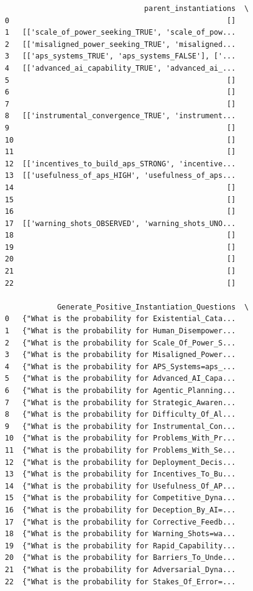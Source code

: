 \documentclass[
  11pt,
  letterpaper,
]{book}
\begin{document}
\begin{verbatim}
                                parent_instantiations  \
0                                                  []   
1   [['scale_of_power_seeking_TRUE', 'scale_of_pow...   
2   [['misaligned_power_seeking_TRUE', 'misaligned...   
3   [['aps_systems_TRUE', 'aps_systems_FALSE'], ['...   
4   [['advanced_ai_capability_TRUE', 'advanced_ai_...   
5                                                  []   
6                                                  []   
7                                                  []   
8   [['instrumental_convergence_TRUE', 'instrument...   
9                                                  []   
10                                                 []   
11                                                 []   
12  [['incentives_to_build_aps_STRONG', 'incentive...   
13  [['usefulness_of_aps_HIGH', 'usefulness_of_aps...   
14                                                 []   
15                                                 []   
16                                                 []   
17  [['warning_shots_OBSERVED', 'warning_shots_UNO...   
18                                                 []   
19                                                 []   
20                                                 []   
21                                                 []   
22                                                 []   

            Generate_Positive_Instantiation_Questions  \
0   {"What is the probability for Existential_Cata...   
1   {"What is the probability for Human_Disempower...   
2   {"What is the probability for Scale_Of_Power_S...   
3   {"What is the probability for Misaligned_Power...   
4   {"What is the probability for APS_Systems=aps_...   
5   {"What is the probability for Advanced_AI_Capa...   
6   {"What is the probability for Agentic_Planning...   
7   {"What is the probability for Strategic_Awaren...   
8   {"What is the probability for Difficulty_Of_Al...   
9   {"What is the probability for Instrumental_Con...   
10  {"What is the probability for Problems_With_Pr...   
11  {"What is the probability for Problems_With_Se...   
12  {"What is the probability for Deployment_Decis...   
13  {"What is the probability for Incentives_To_Bu...   
14  {"What is the probability for Usefulness_Of_AP...   
15  {"What is the probability for Competitive_Dyna...   
16  {"What is the probability for Deception_By_AI=...   
17  {"What is the probability for Corrective_Feedb...   
18  {"What is the probability for Warning_Shots=wa...   
19  {"What is the probability for Rapid_Capability...   
20  {"What is the probability for Barriers_To_Unde...   
21  {"What is the probability for Adversarial_Dyna...   
22  {"What is the probability for Stakes_Of_Error=...   


\end{verbatim}
\end{document}
